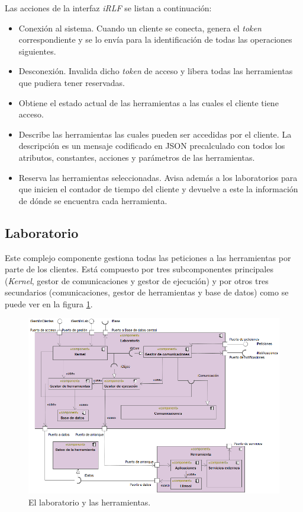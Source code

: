 Las acciones de la interfaz \emph{iRLF} se listan a continuación:

\begin{itemize}
\item Conexión al sistema. Cuando un cliente se conecta, genera el 
\emph{token} correspondiente y se lo envía para la identificación de 
todas las operaciones siguientes.
\item Desconexión. Invalida dicho \emph{token} de acceso y libera 
todas las herramientas que pudiera tener reservadas.
\item Obtiene el estado actual de las herramientas a las cuales el 
cliente tiene acceso.
\item Describe las herramientas las cuales pueden ser accedidas por el 
cliente. La descripción es un mensaje codificado en JSON precalculado 
con todos los atributos, constantes, acciones y parámetros de las 
herramientas.
\item Reserva las herramientas seleccionadas. Avisa además a los 
laboratorios para que inicien el contador de tiempo del cliente y 
devuelve a este la información de dónde se encuentra cada herramienta.
\end{itemize}

\subsection{Laboratorio}
Este complejo componente gestiona todas las peticiones a las herramientas 
por parte de los clientes. Está compuesto por tres subcomponentes 
principales (\emph{Kernel}, gestor de comunicaciones y gestor de 
ejecución) y por otros tres secundarios (comunicaciones, gestor de 
herramientas y base de datos) como se puede ver en la figura 
\ref{fig:Laboratorio}.

\begin{figure}[H]
	\centering
	\includegraphics[scale=0.6]{images/Laboratorio.png}
	\caption{El laboratorio y las herramientas.}
	\label{fig:Laboratorio}
\end{figure}

